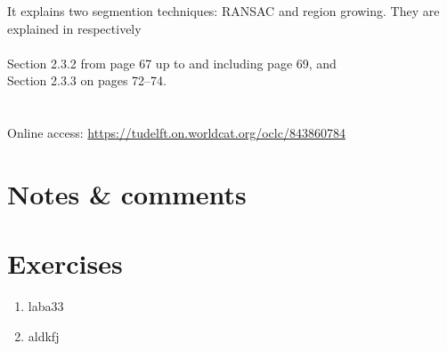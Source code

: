 \begin{link-box}
  It explains two segmention techniques: RANSAC and region growing. They are explained in respectively
  \\ \\
  Section 2.3.2 from page 67 up to and including page 69, and \\
  Section 2.3.3 on pages 72--74.
  \\ \\
  \\
  Online access: \url{https://tudelft.on.worldcat.org/oclc/843860784}
\end{link-box}




%
\section{Notes \& comments}







%
\section{Exercises}


\begin{enumerate}
  \item laba33
  \item aldkfj
\end{enumerate}

